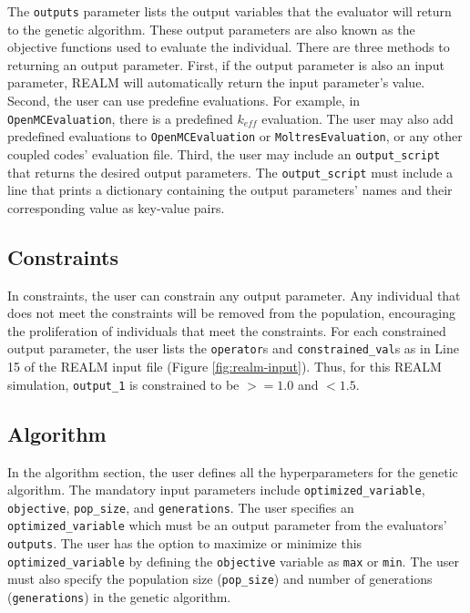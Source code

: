 The \texttt{outputs} parameter lists the output variables that the evaluator 
will return to the genetic algorithm. 
These output parameters are also known as the objective functions used to 
evaluate the individual.  
There are three methods to returning an output parameter. 
First, if the output parameter is also an input parameter, REALM will automatically 
return the input parameter's value. 
Second, the user can use predefine evaluations. 
For example, in \texttt{OpenMCEvaluation}, there is a predefined $k_{eff}$ 
evaluation.
The user may also add predefined evaluations to \texttt{OpenMCEvaluation} or 
\texttt{MoltresEvaluation}, or any other coupled codes' evaluation file.
Third, the user may include an \texttt{output\_script} that returns the desired 
output parameters. 
The \texttt{output\_script} must include a line that prints a dictionary containing 
the output parameters' names and their corresponding value as key-value pairs. 

\subsection{Constraints}
In constraints, the user can constrain any output parameter. 
Any individual that does not meet the constraints will be removed from the 
population, encouraging the proliferation of individuals that meet the 
constraints. 
For each constrained output parameter, the user lists the \texttt{operator}s 
and \texttt{constrained\_val}s as in Line 15 of the REALM input file 
(Figure \ref{fig:realm-input}). 
Thus, for this REALM simulation, \texttt{output\_1} is constrained to be 
$>= 1.0$ and $< 1.5$. 

\subsection{Algorithm}

In the algorithm section, the user defines all the hyperparameters for the 
genetic algorithm. 
The mandatory input parameters include \texttt{optimized\_variable}, 
\texttt{objective}, \texttt{pop\_size}, and \texttt{generations}.
The user specifies an \texttt{optimized\_variable} which must be an output 
parameter from the evaluators' \texttt{outputs}. 
The user has the option to maximize or minimize this \texttt{optimized\_variable}
by defining the \texttt{objective} variable as \texttt{max} or \texttt{min}. 
The user must also specify the population size (\texttt{pop\_size}) and number 
of generations (\texttt{generations}) in the genetic algorithm. 

